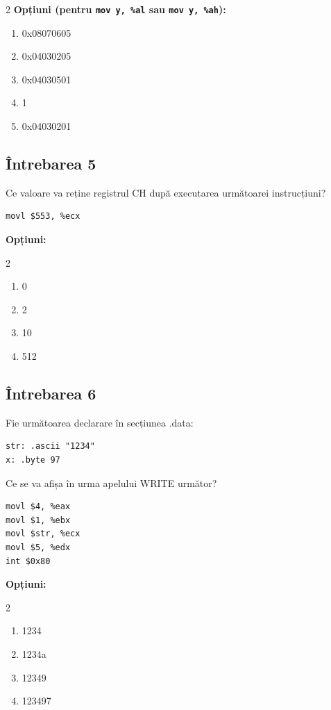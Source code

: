 \documentclass[12pt,a4paper]{article}
\begin{document}
\begin{multicols}{2}
\textbf{Opțiuni (pentru \texttt{mov y, \%al} sau \texttt{mov y, \%ah}):}
\begin{enumerate}[label=\alph*)]
    \item 0x08070605
    \item 0x04030205 
    \item 0x04030501
    \item 1
    \item 0x04030201
\end{enumerate}
\end{multicols}

\subsection*{Întrebarea 5}
Ce valoare va reține registrul CH după executarea următoarei instrucțiuni?
\begin{lstlisting}[language=x86asm]
movl $553, %ecx
\end{lstlisting}

\textbf{Opțiuni:}
\begin{multicols}{2}
\begin{enumerate}[label=\alph*)]
    \item 0
    \item 2 
    \item 10
    \item 512
\end{enumerate}
\end{multicols}

\subsection*{Întrebarea 6}
Fie următoarea declarare în secțiunea .data:
\begin{lstlisting}[language=x86asm]
str: .ascii "1234"
x: .byte 97
\end{lstlisting}
Ce se va afișa în urma apelului WRITE următor?
\begin{lstlisting}[language=x86asm]
movl $4, %eax
movl $1, %ebx
movl $str, %ecx
movl $5, %edx
int $0x80
\end{lstlisting}

\textbf{Opțiuni:}
\begin{multicols}{2}
\begin{enumerate}[label=\alph*)]
    \item 1234
    \item 1234a
    \item 12349
    \item 123497
\end{enumerate}
\end{multicols}
\end{document}
